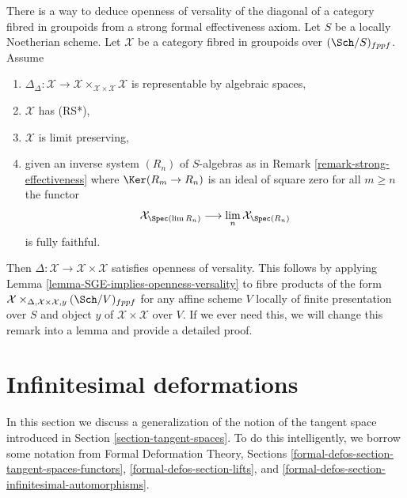 \begin{remark}
\label{remark-trade-openness-versality-diagonal-with-strong-effectiveness}
There is a way to deduce openness of versality of the diagonal
of a category fibred in groupoids from a strong formal effectiveness
axiom.
Let $S$ be a locally Noetherian scheme. Let $\mathcal{X}$ be a category fibred
in groupoids over $(\Sch/S)_{fppf}$. Assume
\begin{enumerate}
\item $\Delta_\Delta : \mathcal{X} \to
\mathcal{X} \times_{\mathcal{X} \times \mathcal{X}} \mathcal{X}$
is representable by algebraic spaces,
\item $\mathcal{X}$ has (RS*),
\item $\mathcal{X}$ is limit preserving,
\item given an inverse system $(R_n)$ of $S$-algebras
as in Remark \ref{remark-strong-effectiveness}
where $\Ker(R_m \to R_n)$ is an ideal of square zero for all $m \geq n$
the functor
$$
\mathcal{X}_{\Spec(\lim R_n)} \longrightarrow
\lim_n \mathcal{X}_{\Spec(R_n)}
$$
is fully faithful.
\end{enumerate}
Then $\Delta : \mathcal{X} \to \mathcal{X} \times \mathcal{X}$
satisfies openness of versality. This follows by applying
Lemma \ref{lemma-SGE-implies-openness-versality}
to fibre products of the form
$\mathcal{X} \times_{\Delta, \mathcal{X} \times \mathcal{X}, y}
(\Sch/V)_{fppf}$ for any affine scheme $V$ locally
of finite presentation over $S$ and object $y$ of
$\mathcal{X} \times \mathcal{X}$ over $V$.
If we ever need this, we will change this remark into
a lemma and provide a detailed proof.
\end{remark}











\section{Infinitesimal deformations}
\label{section-inf}

\noindent
In this section we discuss a generalization of the notion of the
tangent space introduced in Section \ref{section-tangent-spaces}.
To do this intelligently, we borrow some notation from
Formal Deformation Theory, Sections
\ref{formal-defos-section-tangent-spaces-functors},
\ref{formal-defos-section-lifts}, and
\ref{formal-defos-section-infinitesimal-automorphisms}.

